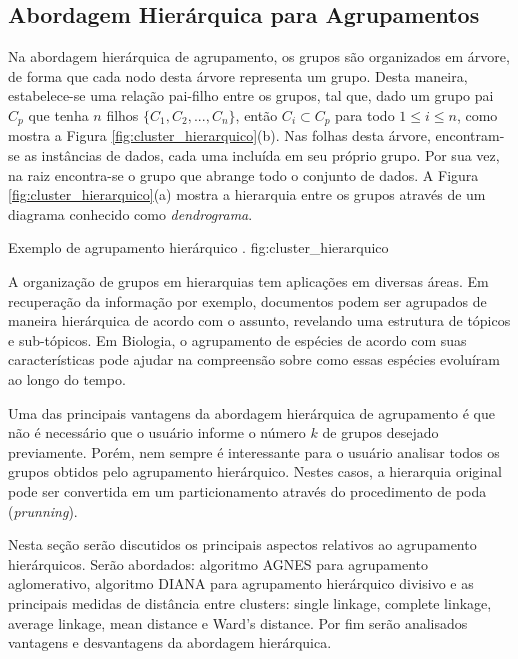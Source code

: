 \subsection{Abordagem Hierárquica para Agrupamentos}
	\label{subsec:abordagem_hierarquica}
	
Na abordagem hierárquica de agrupamento, os grupos são organizados em árvore, de
forma que cada nodo desta árvore representa um grupo. Desta maneira,
estabelece-se uma relação pai-filho entre os grupos, tal que, dado um grupo pai
$C_p$ que tenha $n$ filhos $\{C_1, C_2,...,C_n\}$, então $C_i \subset C_p$ para
todo $1 \leq i \leq n$, como mostra a Figura \ref{fig:cluster_hierarquico}(b).
Nas folhas desta árvore, encontram-se as instâncias de dados, cada uma incluída
em seu próprio grupo. Por sua vez, na raiz encontra-se o grupo que abrange todo
o conjunto de dados. A Figura \ref{fig:cluster_hierarquico}(a) mostra a
hierarquia entre os grupos através de um diagrama conhecido como
\emph{dendrograma}.

{Exemplo de agrupamento hierárquico \cite{tan2009introducao}.}
{fig:cluster_hierarquico}

A organização de grupos em hierarquias tem aplicações em diversas áreas. Em 
recuperação da informação por exemplo, documentos podem ser agrupados de maneira
hierárquica de acordo com o assunto, revelando uma estrutura de tópicos e
sub-tópicos. Em Biologia, o agrupamento de espécies de acordo com suas
características pode ajudar na compreensão sobre como essas espécies evoluíram
ao longo do tempo.

Uma das principais vantagens da abordagem hierárquica de agrupamento é que não
é necessário que o usuário informe o número $k$ de grupos desejado previamente.
Porém, nem sempre é interessante para o usuário analisar todos os grupos obtidos
pelo agrupamento hierárquico. Nestes casos, a hierarquia original pode ser
convertida em um particionamento através do procedimento de poda
(\emph{prunning}). 

Nesta seção serão discutidos os principais aspectos relativos ao agrupamento
hierárquicos. Serão abordados: algoritmo AGNES para agrupamento aglomerativo, 
algoritmo DIANA para agrupamento hierárquico divisivo e as principais medidas
de distância entre clusters: single linkage, complete linkage, average linkage,
mean distance e Ward's distance. Por fim serão analisados vantagens e
desvantagens da abordagem hierárquica.


